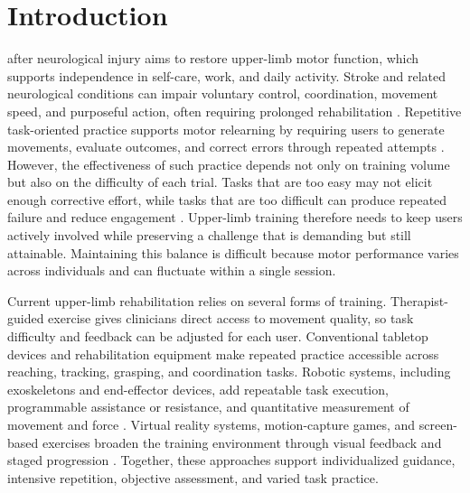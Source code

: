 \documentclass[lettersize,journal]{IEEEtran}
\begin{document}
\section{Introduction}
\label{sec:introduction}
 after neurological injury aims to restore upper-limb motor function, which supports independence in self-care, work, and daily activity. Stroke and related neurological conditions can impair voluntary control, coordination, movement speed, and purposeful action, often requiring prolonged rehabilitation \cite{gbdStrokeBurden2021,stinearStrokeRehab2020}. Repetitive task-oriented practice supports motor relearning by requiring users to generate movements, evaluate outcomes, and correct errors through repeated attempts \cite{maierNeurorehabPrinciples2019,leeTaskOrientedTraining2024,rozevinkTaskSpecificTraining2023}. However, the effectiveness of such practice depends not only on training volume but also on the difficulty of each trial. Tasks that are too easy may not elicit enough corrective effort, while tasks that are too difficult can produce repeated failure and reduce engagement \cite{guadagnoliChallengePoint2004,gomesTaskChallenge2025}. Upper-limb training therefore needs to keep users actively involved while preserving a challenge that is demanding but still attainable. Maintaining this balance is difficult because motor performance varies across individuals and can fluctuate within a single session.

Current upper-limb rehabilitation relies on several forms of training. Therapist-guided exercise gives clinicians direct access to movement quality, so task difficulty and feedback can be adjusted for each user. Conventional tabletop devices and rehabilitation equipment make repeated practice accessible across reaching, tracking, grasping, and coordination tasks. Robotic systems, including exoskeletons and end-effector devices, add repeatable task execution, programmable assistance or resistance, and quantitative measurement of movement and force \cite{mehrholzRobotArmTraining2018,rodgersRATULS2019,suUpperRobotTraining2024,boardsworthUpperLimbRobotic2025,wangRobotAssistedNetwork2025,aiMachineLearningRehab2023}. Virtual reality systems, motion-capture games, and screen-based exercises broaden the training environment through visual feedback and staged progression \cite{doumasSeriousGames2021,keneaImmersiveVR2025,altawilAdaptiveVR2026}. Together, these approaches support individualized guidance, intensive repetition, objective assessment, and varied task practice.
\end{document}
